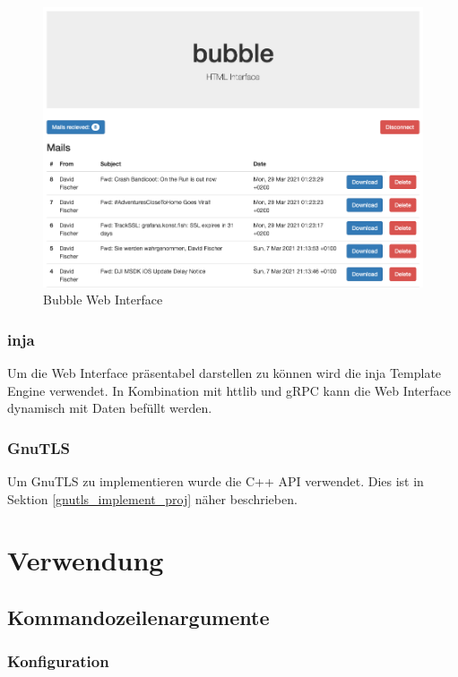\documentclass[12pt, letterpaper]{article}
\begin{document}
\begin{figure}[H]
  \centering
  \includegraphics[width=1\textwidth]{web_interface.png}
  \caption{Bubble Web Interface}
  \label{fig:bubble_web_interface}
\end{figure}

\subsubsection{inja}
Um die Web Interface präsentabel darstellen zu können wird die inja Template Engine\cite{inja-ref} verwendet. In Kombination mit httlib und gRPC kann die Web Interface dynamisch mit Daten befüllt werden.

\subsubsection{GnuTLS}
Um GnuTLS zu implementieren wurde die C++ API verwendet\cite{gnutls_cpp}. Dies ist in Sektion \ref{gnutls_implement_proj} näher beschrieben.

\section{Verwendung}
\label{usage}

\subsection{Kommandozeilenargumente}

\subsubsection{Konfiguration}
\end{document}
